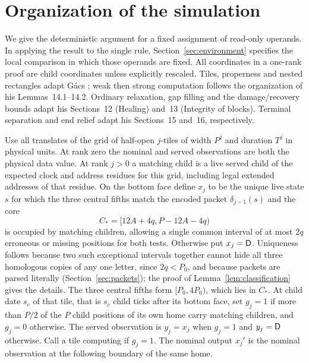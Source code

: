\section{Organization of the simulation}\label{sec:organization}

We give the deterministic argument for a fixed assignment of read-only operands. In applying the result to the single rule, Section~\ref{sec:environment} specifies the local comparison in which those operands are fixed. All coordinates in a one-rank proof are child coordinates unless explicitly rescaled. Tiles, properness and nested rectangles adapt G\'acs \cite[Sections~10--11, including Lemma~11.2]{gacs86}; weak then strong computation follows the organization of his Lemmas~14.1--14.2. Ordinary relaxation, gap filling and the damage/recovery bounds adapt his Sections~12 (Healing) and~13 (Integrity of blocks). Terminal separation and end relief adapt his Sections~15 and~16, respectively.

\begin{definition}\label{def:observations}
Use all translates of the grid of half-open \(j\)-tiles of width \(P^j\) and duration \(T^j\) in physical units. At rank zero the nominal and served observations are both the physical data value. At rank \(j>0\) a matching child is a live served child of the expected clock and address residues for this grid, including legal extended addresses of that residue. On the bottom face define \(x_j\) to be the unique live state \(s\) for which the three central fifths match the encoded packet \(\delta_{j-1}(s)\) and the core
\[
C_*=[12A+4q,P-12A-4q)
\]
is occupied by matching children, allowing a single common interval of at most \(2q\) erroneous or missing positions for both tests. Otherwise put \(x_j=\mathsf D\). Uniqueness follows because two such exceptional intervals together cannot hide all three homologous copies of any one letter, since \(2q<P_0\), and because packets are parsed literally (Section~\ref{sec:packets}); the proof of Lemma~\ref{lem:classification} gives the details. The three central fifths form \([P_0,4P_0)\), which lies in \(C_*\). At child date \(s_c\) of that tile, that is \(s_c\) child ticks after its bottom face, set \(g_j=1\) if more than \(P/2\) of the \(P\) child positions of its own home carry matching children, and \(g_j=0\) otherwise. The served observation is \(y_j=x_j\) when \(g_j=1\) and \(y_j=\mathsf D\) otherwise. Call a tile computing if \(g_j=1\). The nominal output \(x_j'\) is the nominal observation at the following boundary of the same home.
\end{definition}

